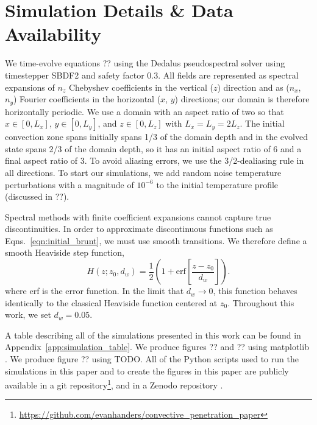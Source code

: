 \section{Simulation Details \& Data Availability}
\label{app:simulation_details}
We time-evolve equations ?? using the Dedalus pseudospectral solver \citep{burns_etal_2020} using timestepper SBDF2 \citep{wang_ruuth_2020} and safety factor 0.3.
All fields are represented as spectral expansions of $n_z$ Chebyshev coefficients in the vertical ($z$) direction and as ($n_x$, $n_y$) Fourier coefficients in the horizontal ($x$, $y$) directions; our domain is therefore horizontally periodic.
We use a domain with an aspect ratio of two so that $x \in [0, L_x]$, $y \in [0, L_y]$, and $z \in [0, L_z]$ with $L_x = L_y = 2L_z$.
The initial convection zone spans initially spans 1/3 of the domain depth and in the evolved state spans 2/3 of the domain depth, so it has an initial aspect ratio of 6 and a final aspect ratio of 3.
To avoid aliasing errors, we use the 3/2-dealiasing rule in all directions.
To start our simulations, we add random noise temperature perturbations with a magnitude of $10^{-6}$ to the initial temperature profile (discussed in ??).

Spectral methods with finite coefficient expansions cannot capture true discontinuities.
In order to approximate discontinuous functions such as Eqns.~\ref{eqn:initial_brunt}, we must use smooth transitions.
We therefore define a smooth Heaviside step function,
\begin{equation}
H(z; z_0, d_w) = \frac{1}{2}\left(1 + \mathrm{erf}\left[\frac{z - z_0}{d_w}\right]\right).
\label{eqn:heaviside}
\end{equation}
where erf is the error function.
In the limit that $d_w \rightarrow 0$, this function behaves identically to the classical Heaviside function centered at $z_0$.
Throughout this work, we set $d_w = 0.05$.

A table describing all of the simulations presented in this work can be found in Appendix~\ref{app:simulation_table}.
We produce figures ?? and ?? using matplotlib \citep{hunter2007, mpl3.3.4}.
We produce figure ?? using TODO.
All of the Python scripts used to run the simulations in this paper and to create the figures in this paper are publicly available in a git repository\footnote{\url{https://github.com/evanhanders/convective_penetration_paper}}, and in a Zenodo repository \citep{supp}.
